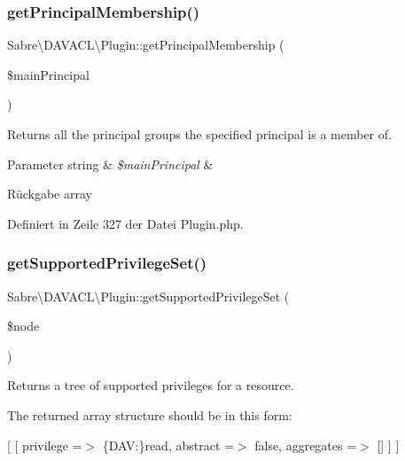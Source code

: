 \subsubsection{\texorpdfstring{get\+Principal\+Membership()}{getPrincipalMembership()}}
{\footnotesize\ttfamily Sabre\textbackslash{}\+D\+A\+V\+A\+C\+L\textbackslash{}\+Plugin\+::get\+Principal\+Membership (\begin{DoxyParamCaption}\item[{}]{\$main\+Principal }\end{DoxyParamCaption})}

Returns all the principal groups the specified principal is a member of.


\begin{DoxyParams}[1]{Parameter}
string & {\em \$main\+Principal} & \\
\hline
\end{DoxyParams}
\begin{DoxyReturn}{Rückgabe}
array 
\end{DoxyReturn}


Definiert in Zeile 327 der Datei Plugin.\+php.

\mbox{\label{class_sabre_1_1_d_a_v_a_c_l_1_1_plugin_a5b185fb435651893c01f3ca1ac2146cb}} 
\subsubsection{\texorpdfstring{get\+Supported\+Privilege\+Set()}{getSupportedPrivilegeSet()}}
{\footnotesize\ttfamily Sabre\textbackslash{}\+D\+A\+V\+A\+C\+L\textbackslash{}\+Plugin\+::get\+Supported\+Privilege\+Set (\begin{DoxyParamCaption}\item[{}]{\$node }\end{DoxyParamCaption})}

Returns a tree of supported privileges for a resource.

The returned array structure should be in this form\+:

\mbox{[} \mbox{[} \textquotesingle{}privilege\textquotesingle{} =$>$ \textquotesingle{}\{D\+AV\+:\}read\textquotesingle{}, \textquotesingle{}abstract\textquotesingle{} =$>$ false, \textquotesingle{}aggregates\textquotesingle{} =$>$ \mbox{[}\mbox{]} \mbox{]} \mbox{]}

